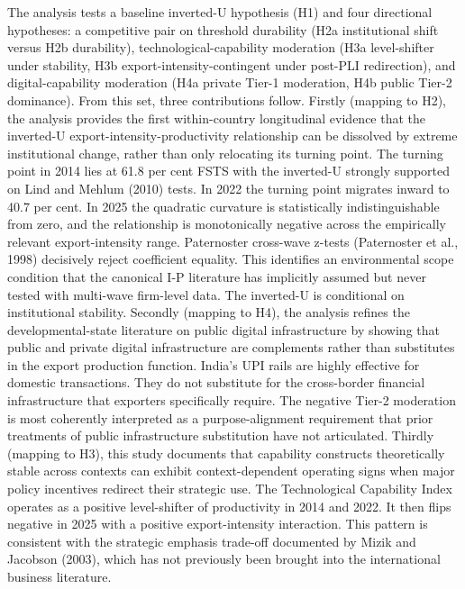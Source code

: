 \documentclass[
  12pt,a4paper]{article}
\begin{document}
The analysis tests a baseline inverted-U hypothesis (H1) and four
directional hypotheses: a competitive pair on threshold durability (H2a
institutional shift versus H2b durability), technological-capability
moderation (H3a level-shifter under stability, H3b
export-intensity-contingent under post-PLI redirection), and
digital-capability moderation (H4a private Tier-1 moderation, H4b public
Tier-2 dominance). From this set, three contributions follow. Firstly
(mapping to H2), the analysis provides the first within-country
longitudinal evidence that the inverted-U export-intensity-productivity
relationship can be dissolved by extreme institutional change, rather
than only relocating its turning point. The turning point in 2014 lies
at 61.8 per cent FSTS with the inverted-U strongly supported on Lind and
Mehlum (2010) tests. In 2022 the turning point migrates inward to 40.7
per cent. In 2025 the quadratic curvature is statistically
indistinguishable from zero, and the relationship is monotonically
negative across the empirically relevant export-intensity range.
Paternoster cross-wave z-tests (Paternoster et al., 1998) decisively
reject coefficient equality. This identifies an environmental scope
condition that the canonical I-P literature has implicitly assumed but
never tested with multi-wave firm-level data. The inverted-U is
conditional on institutional stability. Secondly (mapping to H4), the
analysis refines the developmental-state literature on public digital
infrastructure by showing that public and private digital infrastructure
are complements rather than substitutes in the export production
function. India's UPI rails are highly effective for domestic
transactions. They do not substitute for the cross-border financial
infrastructure that exporters specifically require. The negative Tier-2
moderation is most coherently interpreted as a purpose-alignment
requirement that prior treatments of public infrastructure substitution
have not articulated. Thirdly (mapping to H3), this study documents that
capability constructs theoretically stable across contexts can exhibit
context-dependent operating signs when major policy incentives redirect
their strategic use. The Technological Capability Index operates as a
positive level-shifter of productivity in 2014 and 2022. It then flips
negative in 2025 with a positive export-intensity interaction. This
pattern is consistent with the strategic emphasis trade-off documented
by Mizik and Jacobson (2003), which has not previously been brought into
the international business literature.
\end{document}
